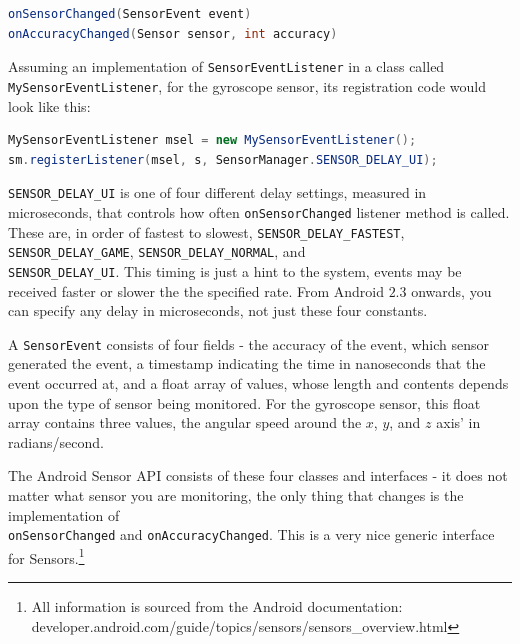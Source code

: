 \documentclass[paper=letter, fontsize=11pt]{scrartcl}
\numberwithin{equation}{section}
\numberwithin{figure}{section}
\numberwithin{table}{section}
\begin{document}
\begin{lstlisting}[basicstyle=\small,language=Java]
onSensorChanged(SensorEvent event)
onAccuracyChanged(Sensor sensor, int accuracy)
\end{lstlisting}

\par
Assuming an implementation of \texttt{SensorEventListener} in a class called\\
\texttt{MySensorEventListener}, for the gyroscope sensor, its registration
code would look like this:

\begin{lstlisting}[basicstyle=\small,language=Java]
MySensorEventListener msel = new MySensorEventListener();
sm.registerListener(msel, s, SensorManager.SENSOR_DELAY_UI);
\end{lstlisting}

\par
\texttt{SENSOR\_DELAY\_UI} is one of four different delay settings, measured in
microseconds, that controls how often \texttt{onSensorChanged} listener method
is called. These are, in order of fastest to slowest,
\texttt{SENSOR\_DELAY\_FASTEST}, \texttt{SENSOR\_DELAY\_GAME},
\texttt{SENSOR\_DELAY\_NORMAL}, and\\ \texttt{SENSOR\_DELAY\_UI}. This timing
is just a hint to the system, events may be received faster or slower the the
specified rate. From Android $2.3$ onwards, you can specify any delay in
microseconds, not just these four constants.

\par
A \texttt{SensorEvent} consists of four fields - the accuracy of the event,
which sensor generated the event, a timestamp indicating the time in
nanoseconds that the event occurred at, and a float array of values, whose
length and contents depends upon the type of sensor being monitored. For the
gyroscope sensor, this float array contains three values, the angular speed
around the $x$, $y$, and $z$ axis' in radians/second.

\par
The Android Sensor \ac{API} consists of these four classes and interfaces - it
does not matter what sensor you are monitoring, the only thing that changes is
the implementation of\\ \texttt{onSensorChanged} and \texttt{onAccuracyChanged}.
This is a very nice generic interface for Sensors.\footnote{All information is
sourced from the Android documentation:\\
developer.android.com/guide/topics/sensors/sensors\_overview.html}
\end{document}

